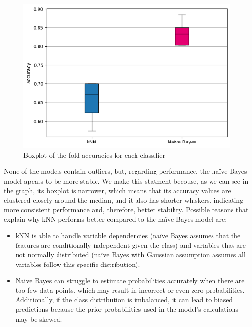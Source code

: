 \documentclass[12pt]{article}
\begin{document}
    \vspace{20pt}
    

        \begin{figure}[H]
            \centering
            \includegraphics[width=12cm]{./Part II/1_a.png}
            \caption{Boxplot of the fold accuracies for each classifier}
        \end{figure}

    \vspace{20pt}

    None of the models contain outliers, but, regarding performance, the naïve Bayes model apears to be more stable. We make this statment becouse, as we can see in the graph, its boxplot is narrower, which means that its accuracy values are clustered closely around the median, and it also has shorter whiskers, indicating more consistent performance and, therefore, better stability.
    Possible reasons that explain why kNN performs better compared to the naïve Bayes model are:
    \begin{itemize}
        \item kNN is able to handle variable dependencies (naïve Bayes assumes that the features are conditionally independent given the class) and variables that are not normally distributed (naïve Bayes with Gaussian assumption assumes all variables follow this specific distribution).
        \item Naive Bayes can struggle to estimate probabilities accurately when there are too few data points, which may result in incorrect or even zero probabilities. Additionally, if the class distribution is imbalanced, it can lead to biased predictions because the prior probabilities used in the model's calculations may be skewed.
    \end{itemize}
\end{document}
